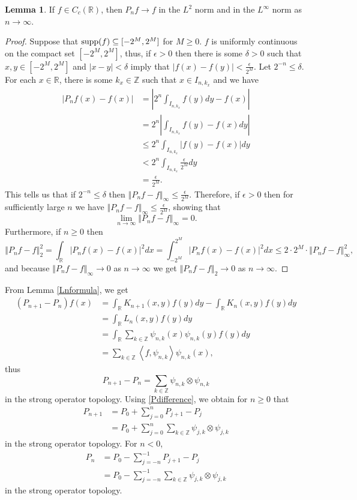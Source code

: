 \documentclass{article}
\newcommand{\inner}[2]{\left\langle #1, #2 \right\rangle}
\newcommand{\supp}{\ensuremath\mathrm{supp}}
\newcommand{\norm}[1]{\left\Vert #1 \right\Vert}
\theoremstyle{definition}
\newtheorem{lemma}[theorem]{Lemma}
\theoremstyle{definition}
\begin{document}
\begin{lemma}
If $f \in C_c(\mathbb{R})$, then $P_nf \to f$ in the $L^2$ norm and in the $L^\infty$ norm as $n \to \infty$.
\label{positivelimit}
\end{lemma}
\begin{proof}
Suppose that $\supp(f) \subseteq [-2^M,2^M]$ for $M \geq 0$. $f$ is uniformly continuous on the compact set $[-2^M,2^M]$, thus, if $\epsilon>0$ then there is some
$\delta>0$ such that $x, y \in [-2^M,2^M]$ and $|x-y|<\delta$ imply that $|f(x)-f(y)|<\frac{\epsilon}{2^M}$.
Let $2^{-n} \leq \delta$. For each $x \in \mathbb{R}$,  there is some $k_x \in \mathbb{Z}$ such that $x \in I_{n,k_x}$ and we have
\begin{align*}
|P_n f(x)-f(x)| &= \left|  2^n \int_{I_{n,k_x}} f(y) dy - f(x) \right|\\
&=2^n \left| \int_{I_{n,k_x}} f(y)-f(x) dy \right|\\
&\leq 2^n \int_{I_{n,k_x}} |f(y)-f(x)| dy\\
&<2^n \int_{I_{n,k_x}} \frac{\epsilon}{2^M} dy\\
&=\frac{\epsilon}{2^M}.
\end{align*}
This tells us that if $2^{-n} \leq \delta$ then $\norm{P_nf -f}_\infty \leq \frac{\epsilon}{2^M}$. Therefore, if $\epsilon>0$ then for sufficiently large
$n$ we have $\norm{P_nf-f}_\infty \leq \frac{\epsilon}{2^M}$, showing that
\[
\lim_{n \to \infty} \norm{P_nf-f}_\infty=0.
\]
Furthermore, if $n \geq 0$ then
\[
\norm{P_nf-f}_2^2=\int_{\mathbb{R}} |P_nf(x)-f(x)|^2 dx
=\int_{-2^M}^{2^M} |P_nf(x)-f(x)|^2 dx
\leq 2\cdot 2^M \cdot \norm{P_nf-f}_\infty^2,
 \]
 and because $\norm{P_nf-f}_\infty \to 0$ as $n \to \infty$ we get $\norm{P_nf-f}_2 \to 0$ as $n \to \infty$.
\end{proof}

From Lemma \ref{Lnformula}, we get
\begin{align*}
(P_{n+1}-P_n)f(x)&=\int_{\mathbb{R}} K_{n+1}(x,y)f(y)dy-\int_{\mathbb{R}} K_n(x,y)f(y)dy\\
&=\int_{\mathbb{R}} L_n(x,y)f(y) dy\\
&=\int_{\mathbb{R}} \sum_{k \in \mathbb{Z}} \psi_{n,k}(x)\psi_{n,k}(y) f(y) dy\\
&=\sum_{k \in \mathbb{Z}} \inner{f}{\psi_{n,k}} \psi_{n,k}(x),
\end{align*}
thus
\begin{equation}
P_{n+1}-P_n=\sum_{k \in \mathbb{Z}} \psi_{n,k} \otimes \psi_{n,k}
\label{Pdifference}
\end{equation}
in the strong operator topology. Using \eqref{Pdifference}, we obtain for $n \geq 0$ that
\begin{align*}
P_{n+1}&=P_0 + \sum_{j=0}^n P_{j+1}-P_j\\
&=P_0+\sum_{j=0}^n \sum_{k \in \mathbb{Z}} \psi_{j,k} \otimes \psi_{j,k}
\end{align*}
in the strong operator topology. For $n<0$,
\begin{align*}
P_n&=P_0-\sum_{j=-n}^{-1} P_{j+1}-P_j\\
&=P_0 - \sum_{j=-n}^{-1} \sum_{k \in \mathbb{Z}} \psi_{j,k} \otimes \psi_{j,k}
\end{align*}
in the strong operator topology.
\end{document}
